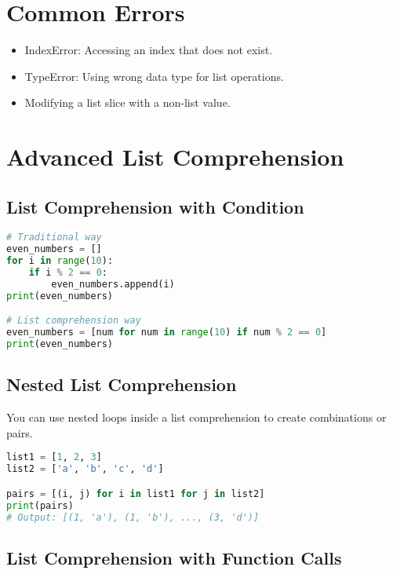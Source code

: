 \section{Common Errors}

\begin{itemize}
    \item IndexError: Accessing an index that does not exist.
    \item TypeError: Using wrong data type for list operations.
    \item Modifying a list slice with a non-list value.
\end{itemize}



\section{Advanced List Comprehension}

\subsection{List Comprehension with Condition}

\begin{lstlisting}[language=Python]
# Traditional way
even_numbers = []
for i in range(10):
    if i % 2 == 0:
        even_numbers.append(i)
print(even_numbers)

# List comprehension way
even_numbers = [num for num in range(10) if num % 2 == 0]
print(even_numbers)
\end{lstlisting}

\subsection{Nested List Comprehension}

You can use nested loops inside a list comprehension to create combinations or pairs.

\begin{lstlisting}[language=Python]
list1 = [1, 2, 3]
list2 = ['a', 'b', 'c', 'd']

pairs = [(i, j) for i in list1 for j in list2]
print(pairs)
# Output: [(1, 'a'), (1, 'b'), ..., (3, 'd')]
\end{lstlisting}

\subsection{List Comprehension with Function Calls}


